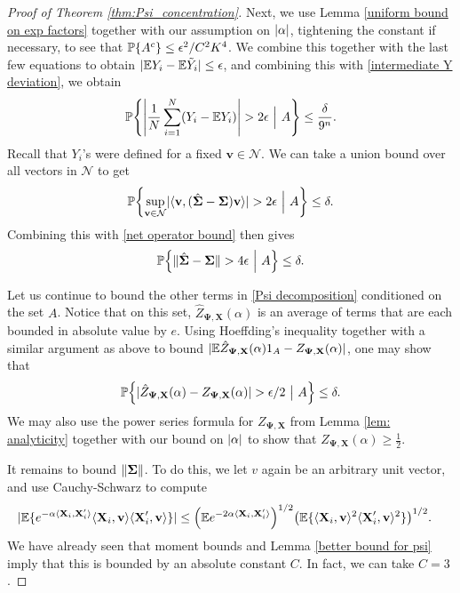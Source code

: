 \documentclass[final,12pt]{colt2018} %
\numberwithin{equation}{section}
\DeclarePairedDelimiter{\abs}{\lvert}{\rvert}
\DeclarePairedDelimiter{\norm}{\lVert}{\rVert}
\DeclarePairedDelimiter{\paren}{(}{)}
\DeclarePairedDelimiter{\braces}{\lbrace}{\rbrace}
\DeclarePairedDelimiter{\inprod}{\langle}{\rangle}
\renewcommand{\P}{\mathbb{P}}
\newcommand{\E}{\mathbb{E}}
\newcommand{\boldv}{\textbf{v}}
\newcommand{\boldSigma}{\boldsymbol{\Sigma}}
\newcommand{\boldPsi}{\boldsymbol{\Psi}}
\newcommand{\boldX}{\textbf{X}}
\begin{document}
\begin{proof}[Proof of Theorem \ref{thm:Psi_concentration}]
	Next, we use Lemma \ref{uniform bound on exp factors} together with our assumption on $\abs{\alpha}$, tightening the constant if necessary, to see that $\P\braces*{A^c} \leq \epsilon^2/C^2K^4$. We combine this together with the last few equations to obtain $\abs{\E Y_i - \E\tilde{Y}_i} \leq \epsilon$, and combining this with \eqref{intermediate Y deviation}, we obtain
	\begin{align}
	\P\braces*{\abs*{\frac{1}{N}\sum_{i=1}^N \paren{Y_i - \E Y_i}} > 2\epsilon \ \Big| \ A} \leq \frac{\delta}{9^n}.
	\end{align}
	Recall that $Y_i$'s were defined for a fixed $\boldv \in \mathcal{N}$. We can take a union bound over all vectors in $\mathcal{N}$ to get
	\begin{align}
	\P\braces*{ \sup_{\boldv \in \mathcal{N}}\abs{\inprod{\boldv,(\hat{\boldSigma}-\boldSigma)\boldv}} > 2\epsilon \ \Big| \ A} \leq \delta.
	\end{align}
	Combining this with \eqref{net operator bound} then gives
	\begin{align}
	\P\braces*{ \norm{\hat{\boldSigma} - \boldSigma } > 4\epsilon \ \Big| \ A} \leq \delta.
	\end{align}
	
	Let us continue to bound the other terms in \eqref{Psi decomposition} conditioned on the set $A$. Notice that on this set, $\hat{Z}_{\boldPsi,\boldX}(\alpha)$ is an average of terms that are each bounded in absolute value by $e$. Using Hoeffding's inequality together with a similar argument as above to bound $\abs{\E\hat{Z}_{\boldPsi,\boldX}(\alpha)1_A - Z_{\boldPsi,\boldX}(\alpha)}$, one may show that
	\begin{align}
	\P\braces*{\abs{\hat{Z}_{\boldPsi,\boldX}(\alpha) - Z_{\boldPsi,\boldX}(\alpha)} > \epsilon/2 \  \big| \ A } \leq \delta.
	\end{align}
	We may also use the power series formula for $Z_{\boldPsi,\boldX}$ from Lemma \ref{lem: analyticity} together with our bound on $\abs{\alpha}$ to show that $Z_{\boldPsi,\boldX}(\alpha) \geq \frac{1}{2}$.
	
	It remains to bound $\norm{\boldSigma}$. To do this, we let $v$ again be an arbitrary unit vector, and use Cauchy-Schwarz to compute
	\begin{align}
	\abs{\E\braces{e^{-\alpha\inprod{\boldX_i,\boldX_i'}}\inprod{\boldX_i,\boldv}\inprod{\boldX_i',\boldv}}} & \leq \paren*{\E e^{-2\alpha\inprod{\boldX_i,\boldX_i'}}}^{1/2} \paren*{\E\braces{\inprod{\boldX_i,\boldv}^2\inprod{\boldX_i',\boldv}^2}}^{1/2}.
	\end{align}
	We have already seen that moment bounds and Lemma \ref{better bound for psi} imply that this is bounded by an absolute constant $C$. In fact, we can take $C = 3$.
	

\end{proof}
\end{document}
